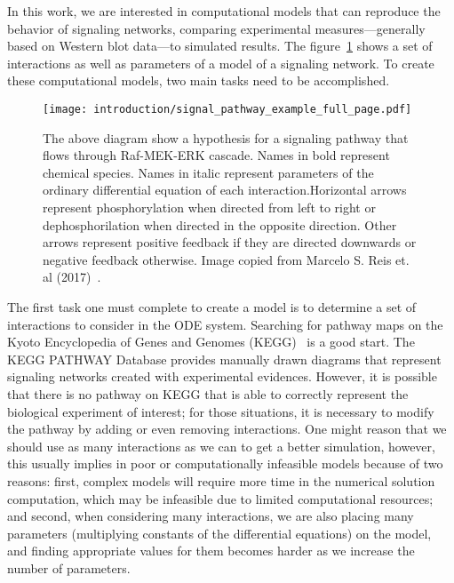 In this work, we are interested in computational models that can 
reproduce the behavior of signaling networks, comparing experimental 
measures---generally based on Western blot data---to simulated results.
The figure~\ref{fig:signal_pathway_example} shows a set of interactions
as well as parameters of a model of a signaling network. To create these 
computational models, two main tasks need to be accomplished.

\begin{figure}[!ht]
\centering 
    \texttt{[image: introduction/signal\_pathway\_example\_full\_page.pdf]}
\caption{The above diagram show a hypothesis for a signaling pathway 
    that flows through Raf-MEK-ERK cascade. Names in bold represent 
    chemical species. Names in italic represent parameters of the 
    ordinary differential equation of each interaction.Horizontal arrows
    represent phosphorylation when directed from left to right or 
    dephosphorilation when directed in the opposite direction. Other 
    arrows represent positive feedback if they are directed downwards or 
    negative feedback otherwise. Image copied from Marcelo S. Reis et.
    al (2017)~\cite{Reis2017}.}
\label{fig:signal_pathway_example}
\end{figure}

The first task one must complete to create a model is to determine a set 
of interactions to consider in the ODE system. Searching for pathway 
maps on the Kyoto Encyclopedia of Genes and Genomes 
(KEGG)~\cite{Kanehisa2000kegg} is a good start. The KEGG PATHWAY 
Database provides manually drawn diagrams that represent signaling 
networks created with experimental evidences. However, it is possible 
that there is no pathway on KEGG that is able to correctly represent the 
biological experiment of interest; for those situations, it is necessary 
to modify the pathway by adding or even removing interactions. One might 
reason that we should use as many interactions as we can to get a better 
simulation, however, this usually implies in poor or computationally 
infeasible models because of two reasons: first, complex models will 
require more time in the numerical solution computation, which may be 
infeasible due to limited computational resources; and second, when 
considering many interactions, we are also placing many parameters 
(multiplying constants of the differential equations) on the model, and 
finding appropriate values for them becomes harder as we increase the 
number of parameters.

